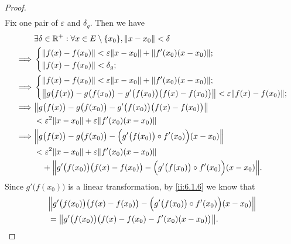 \begin{proof}
\begin{align*}
  \end{align*}
  Fix one pair of \(\varepsilon\) and \(\delta_g\).
  Then we have
  \begin{align*}
             & \exists \delta \in \R^+ : \forall x \in E \setminus \set{x_0}, \norm*{x - x_0} < \delta                                      \\
    \implies & \begin{dcases}
                 \norm*{f(x) - f(x_0)} < \varepsilon \norm*{x - x_0} + \norm*{f'(x_0)(x - x_0)}; \\
                 \norm*{f(x) - f(x_0)} < \delta_g;
               \end{dcases}                                              \\
    \implies & \begin{dcases}
                 \norm*{f(x) - f(x_0)} < \varepsilon \norm*{x - x_0} + \norm*{f'(x_0)(x - x_0)}; \\
                 \norm*{g\big(f(x)\big) - g\big(f(x_0)\big) - g'\big(f(x_0)\big) \big(f(x) - f(x_0)\big)} < \varepsilon \norm*{f(x) - f(x_0)};
               \end{dcases} \\
    \implies & \norm*{g\big(f(x)\big) - g\big(f(x_0)\big) - g'\big(f(x_0)\big) \big(f(x) - f(x_0)\big)}                                     \\
             & < \varepsilon^2 \norm*{x - x_0} + \varepsilon \norm*{f'(x_0)(x - x_0)}                                                       \\
    \implies & \norm*{g\big(f(x)\big) - g\big(f(x_0)\big) - \Big(g'\big(f(x_0)\big) \circ f'(x_0)\Big) (x - x_0)}                           \\
             & < \varepsilon^2 \norm*{x - x_0} + \varepsilon \norm*{f'(x_0)(x - x_0)}                                                       \\
             & \quad + \norm*{g'\big(f(x_0)\big) \big(f(x) - f(x_0)\big) - \Big(g'\big(f(x_0)\big) \circ f'(x_0)\Big) (x - x_0)}.
  \end{align*}
  Since \(g'\big(f(x_0)\big)\) is a linear transformation, by \cref{ii:6.1.6} we know that
  \begin{align*}
     & \norm*{g'\big(f(x_0)\big) \big(f(x) - f(x_0)\big) - \Big(g'\big(f(x_0)\big) \circ f'(x_0)\Big) (x - x_0)} \\
     & = \norm*{g'\big(f(x_0)\big) \big(f(x) - f(x_0) - f'(x_0) (x - x_0)\big)}.
  \end{align*}

\end{proof}
